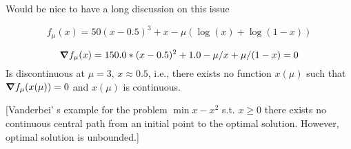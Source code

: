 \documentclass{article}
\begin{document}
Would be nice to have a long discussion on this issue

$$
f_{\mu}(x) = 50 (x - 0.5)^3 + x - \mu (\log(x) + \log(1 - x))
$$

$$
\grad f_{\mu}(x) = 150.0 * (x - 0.5)^2 + 1.0  - \mu / x + \mu / (1 - x) = 0 \\
$$
Is discontinuous at $\mu = 3$, $x \approx 0.5$, i.e., there exists no function $x(\mu)$ such that $\grad f_{\mu}(x(\mu)) = 0$ and $x(\mu)$ is continuous. 

[Vanderbei' s example for the problem $\min{ x -x^2}$ s.t. $x \ge 0$ there exists no continuous central path from an initial point to the optimal solution. However, optimal solution is unbounded.]

\fi


\end{document}
